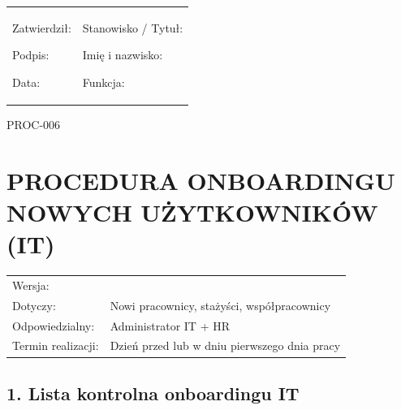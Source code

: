 \documentclass[12pt,a4paper]{article}
\begin{document}
\begin{longtable}[]{@{}
  >{\raggedright\arraybackslash}p{}
  >{\raggedright\arraybackslash}p{}@{}}
\toprule\noalign{}
\endhead
\bottomrule\noalign{}
\endlastfoot
\begin{minipage}[t]{\linewidth}\raggedright
Zatwierdził:

Podpis: \underline{\hspace{3cm}}

Data: \underline{\hspace{4cm}}
\end{minipage} & \begin{minipage}[t]{\linewidth}\raggedright
Stanowisko / Tytuł:

Imię i nazwisko: \underline{\hspace{3cm}}

Funkcja: \underline{\hspace{3cm}}
\end{minipage} \\
\end{longtable}

\label{doc6}
PROC-006

\section{PROCEDURA ONBOARDINGU NOWYCH UŻYTKOWNIKÓW
(IT)}\label{procedura-onboardingu-nowych-uux17cytkownikuxf3w-it}

\begin{longtable}[]{@{}>{\raggedright\arraybackslash}p{}>{\raggedright\arraybackslash}p{}@{}}
\toprule\noalign{}
\endhead
\bottomrule\noalign{}
\endlastfoot
Wersja: & 1.0 \\
Dotyczy: & Nowi pracownicy, stażyści, współpracownicy \\
Odpowiedzialny: & Administrator IT + HR \\
Termin realizacji: & Dzień przed lub w dniu pierwszego dnia pracy \\
\end{longtable}

\subsection{1. Lista kontrolna onboardingu
IT}\label{lista-kontrolna-onboardingu-it}
\end{document}

